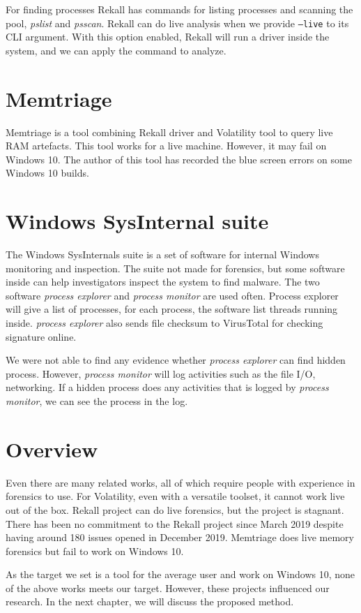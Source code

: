 For finding processes Rekall has commands for listing processes and scanning the pool, \textit{pslist} and \textit{psscan}. Rekall can do live analysis when we provide \texttt{--live} to its CLI argument. With this option enabled, Rekall will run a driver inside the system, and we can apply the command to analyze.

\section[Memtriage]{Memtriage}

Memtriage \cite{memtriage} is a tool combining Rekall driver and Volatility tool to query live RAM artefacts. This tool works for a live machine. However, it may fail on Windows 10. The author of this tool has recorded the blue screen errors on some Windows 10 builds.

\section[Windows SysInternal suite]{Windows SysInternal suite}

The Windows SysInternals \cite{sysinternal} suite is a set of software for internal Windows monitoring and inspection. The suite not made for forensics, but some software inside can help investigators inspect the system to find malware. The two software \textit{process explorer} and \textit{process monitor} are used often. Process explorer will give a list of processes, for each process, the software list threads running inside. \textit{process explorer} also sends file checksum to VirusTotal for checking signature online.

We were not able to find any evidence whether \textit{process explorer} can find hidden process. However, \textit{process monitor} will log activities such as the file I/O, networking. If a hidden process does any activities that is logged by \textit{process monitor}, we can see the process in the log.

\section[Overview]{Overview}

Even there are many related works, all of which require people with experience in forensics to use. For Volatility, even with a versatile toolset, it cannot work live out of the box. Rekall project can do live forensics, but the project is stagnant. There has been no commitment to the Rekall project since March 2019 despite having around 180 issues opened in December 2019. Memtriage does live memory forensics but fail to work on Windows 10.

As the target we set is a tool for the average user and work on Windows 10, none of the above works meets our target. However, these projects influenced our research. In the next chapter, we will discuss the proposed method.
